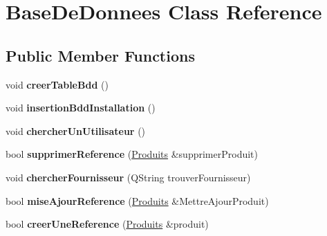 \hypertarget{class_base_de_donnees}{}\section{Base\+De\+Donnees Class Reference}
\label{class_base_de_donnees}
\subsection*{Public Member Functions}
\begin{DoxyCompactItemize}
\item 
\mbox{\label{class_base_de_donnees_a888c0084f35395cc2aaae8326a27af06}} 
void {\bfseries creer\+Table\+Bdd} ()
\item 
\mbox{\label{class_base_de_donnees_a635a8df387997ad54a4bcc4b8bce1a78}} 
void {\bfseries insertion\+Bdd\+Installation} ()
\item 
\mbox{\label{class_base_de_donnees_a9b8f8d9aca5ac268cba19329e3264c01}} 
void {\bfseries chercher\+Un\+Utilisateur} ()
\item 
\mbox{\label{class_base_de_donnees_a824bea64c3ef77eff0e4334a617b36c8}} 
bool {\bfseries supprimer\+Reference} (\mbox{\hyperlink{class_produits}{Produits}} \&supprimer\+Produit)
\item 
\mbox{\label{class_base_de_donnees_aaff06392cdd1aa3e3e66f1bb8214d1fb}} 
void {\bfseries chercher\+Fournisseur} (Q\+String trouver\+Fournisseur)
\item 
\mbox{\label{class_base_de_donnees_ae68726c99e17a89342655d8b842ced96}} 
bool {\bfseries mise\+Ajour\+Reference} (\mbox{\hyperlink{class_produits}{Produits}} \&Mettre\+Ajour\+Produit)
\item 
\mbox{\label{class_base_de_donnees_a48345312e89c6e8fdeec128f033566ee}} 
bool {\bfseries creer\+Une\+Reference} (\mbox{\hyperlink{class_produits}{Produits}} \&produit)
\item 
\mbox{\label{class_base_de_donnees_acc7f10ab9b4699eaa495fa7829c0cfbd}} 

\end{DoxyCompactItemize}

